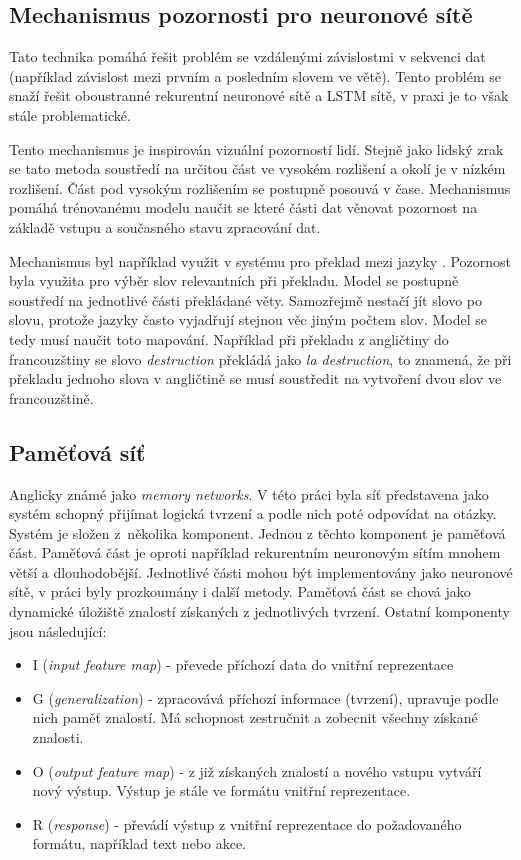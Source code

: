 \subsection{Mechanismus pozornosti pro neuronové sítě}
Tato technika pomáhá řešit problém se vzdálenými závislostmi v sekvenci dat (například závislost mezi prvním a posledním slovem ve větě). Tento problém se snaží řešit oboustranné rekurentní neuronové sítě a LSTM sítě, v praxi je to však stále problematické. 

Tento mechanismus je inspirován vizuální pozorností lidí. Stejně jako lidský zrak se tato metoda soustředí na určitou část ve vysokém rozlišení a okolí je v nízkém rozlišení. Část pod vysokým rozlišením se postupně posouvá v čase. Mechanismus pomáhá trénovanému modelu naučit se které části dat věnovat pozornost na základě vstupu a současného stavu zpracování dat. 


Mechanismus byl například využit v systému pro překlad mezi jazyky \cite{Bahdanau2015NeuralMT}. Pozornost byla využita pro výběr slov relevantních při překladu. Model se postupně soustředí na jednotlivé části překládané věty. Samozřejmě nestačí jít slovo po slovu, protože jazyky často vyjadřují stejnou věc jiným počtem slov. Model se tedy musí naučit toto mapování. Například při překladu z angličtiny do francouzštiny se slovo \emph{destruction} překládá jako \emph{la destruction}, to znamená, že při překladu jednoho slova v angličtině se musí soustředit na vytvoření dvou slov ve francouzštině. 

\subsection{Paměťová síť}


Anglicky známé jako \emph{memory networks}. V této práci \cite{Weston2015MemoryN} byla síť představena jako systém schopný přijímat logická tvrzení a podle nich poté odpovídat na otázky. Systém je složen z~několika komponent. Jednou z těchto komponent je paměťová část. Paměťová část je oproti například rekurentním neuronovým sítím mnohem větší a dlouhodobější. Jednotlivé části mohou být implementovány jako neuronové sítě, v práci byly prozkoumány i další metody. Paměťová část se chová jako dynamické úložiště znalostí získaných z jednotlivých tvrzení. 
Ostatní komponenty jsou následující:
\begin{itemize}
    \item I (\emph{input feature map}) - převede příchozí data do vnitřní reprezentace
    \item G (\emph{generalization}) - zpracovává příchozí informace (tvrzení), upravuje podle nich paměť znalostí. Má schopnost zestručnit a zobecnit všechny získané znalosti. 
    \item O (\emph{output feature map}) - z již získaných znalostí a nového vstupu vytváří nový výstup. Výstup je stále ve formátu vnitřní reprezentace.
    \item R (\emph{response}) - převádí výstup z vnitřní reprezentace do požadovaného formátu, například text nebo akce.
\end{itemize}

